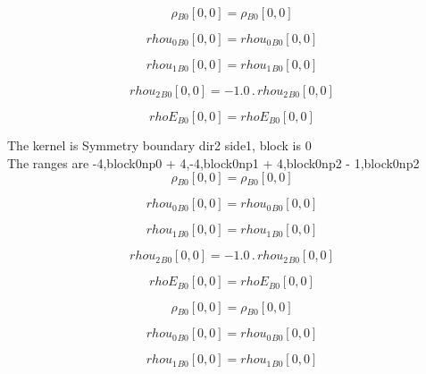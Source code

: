 \documentclass{article}
\begin{document}
\begin{dmath}{\rho{_{B0}}}[{0,0}] = {\rho{_{B0}}}[{0,0}]\end{dmath}

\begin{dmath}{rhou_{0}{_{B0}}}[{0,0}] = {rhou_{0}{_{B0}}}[{0,0}]\end{dmath}

\begin{dmath}{rhou_{1}{_{B0}}}[{0,0}] = {rhou_{1}{_{B0}}}[{0,0}]\end{dmath}

\begin{dmath}{rhou_{2}{_{B0}}}[{0,0}] = - 1.0 \,.\, {rhou_{2}{_{B0}}}[{0,0}]\end{dmath}

\begin{dmath}{rhoE{_{B0}}}[{0,0}] = {rhoE{_{B0}}}[{0,0}]\end{dmath}

\noindent The kernel is Symmetry boundary dir2 side1, block is 0\\\noindent The ranges are -4,block0np0 + 4,-4,block0np1 + 4,block0np2 - 1,block0np2\\\begin{dmath}{\rho{_{B0}}}[{0,0}] = {\rho{_{B0}}}[{0,0}]\end{dmath}

\begin{dmath}{rhou_{0}{_{B0}}}[{0,0}] = {rhou_{0}{_{B0}}}[{0,0}]\end{dmath}

\begin{dmath}{rhou_{1}{_{B0}}}[{0,0}] = {rhou_{1}{_{B0}}}[{0,0}]\end{dmath}

\begin{dmath}{rhou_{2}{_{B0}}}[{0,0}] = - 1.0 \,.\, {rhou_{2}{_{B0}}}[{0,0}]\end{dmath}

\begin{dmath}{rhoE{_{B0}}}[{0,0}] = {rhoE{_{B0}}}[{0,0}]\end{dmath}

\begin{dmath}{\rho{_{B0}}}[{0,0}] = {\rho{_{B0}}}[{0,0}]\end{dmath}

\begin{dmath}{rhou_{0}{_{B0}}}[{0,0}] = {rhou_{0}{_{B0}}}[{0,0}]\end{dmath}

\begin{dmath}{rhou_{1}{_{B0}}}[{0,0}] = {rhou_{1}{_{B0}}}[{0,0}]\end{dmath}
\end{document}
